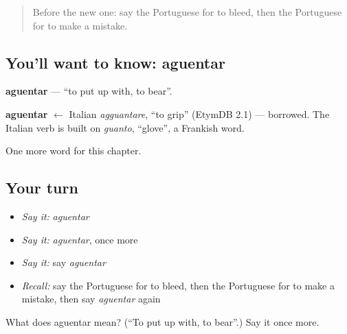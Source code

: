 \label{lesson:PT-C147-aguentar}



\begin{quote}
Before the new one: say the Portuguese for to bleed, then the Portuguese for to make a mistake.
\end{quote}

\subsection*{You'll want to know: aguentar}
\textbf{aguentar} — \textquotedblleft{}to put up with, to bear\textquotedblright{}.

\begin{cousinweb}
\textbf{aguentar} $\leftarrow$ Italian \emph{agguantare}, \textquotedblleft{}to grip\textquotedblright{} (EtymDB 2.1) — borrowed. The Italian verb is built on \emph{guanto}, \textquotedblleft{}glove\textquotedblright{}, a Frankish word.
\end{cousinweb}

\begin{grammarlens}[title={What you've built}]
One more word for this chapter.
\end{grammarlens}

\subsection*{Your turn}
\begin{itemize}
\raggedright
  \item \emph{Say it:} \emph{aguentar}
  \item \emph{Say it:} \emph{aguentar}, once more
  \item \emph{Say it:} say \emph{aguentar}
  \item \emph{Recall:} say the Portuguese for to bleed, then the Portuguese for to make a mistake, then say \emph{aguentar} again
\end{itemize}

\begin{tcolorbox}[breakable,colback=teal!4,colframe=teal!35!black,title={Before you move on}]
What does aguentar mean? (\textquotedblleft{}To put up with, to bear\textquotedblright{}.) Say it once more.
\end{tcolorbox}
